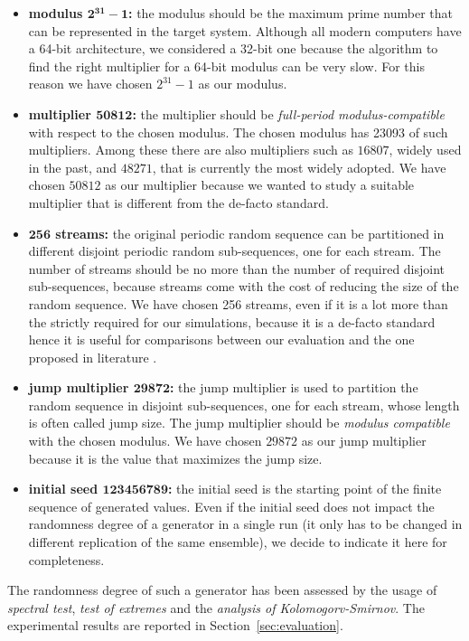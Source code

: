 \begin{itemize}
	\item \textbf{modulus $\mathbf{2^{31}-1}$:} the modulus should be the maximum prime number that can be represented in the target system. 
	Although all modern computers have a 64-bit architecture, we considered a 32-bit one because the algorithm to find the right multiplier for a 64-bit modulus can be very slow.
	For this reason we have chosen $2^{31}-1$ as our modulus.
	
	\item \textbf{multiplier $\mathbf{50812}$:} the multiplier should be \textit{full-period modulus-compatible} with respect to the chosen modulus. The chosen modulus has 23093 of such multipliers. Among these there are also multipliers such as $16807$, widely used in the past, and $48271$, that is currently the most widely adopted.
	We have chosen $50812$ as our multiplier because we wanted to study a suitable multiplier that is different from the de-facto standard.
	
	\item \textbf{$\mathbf{256}$ streams:} the original periodic random sequence can be partitioned in different disjoint periodic random sub-sequences, one for each stream. 
	The number of streams should be no more than the number of required disjoint sub-sequences, because streams come with the cost of reducing the size of the random sequence.
	We have chosen 256 streams, even if it is a lot more than the strictly required for our simulations, because it is a de-facto standard hence it is useful for comparisons between our evaluation and the one proposed in literature \cite{leemis2006discrete}. 
	
	\item \textbf{jump multiplier $\mathbf{29872}$:} the jump multiplier is used to partition the random sequence in disjoint sub-sequences, one for each stream, whose length is often called jump size. The jump multiplier should be \textit{modulus compatible} with the chosen modulus.
	We have chosen $29872$ as our jump multiplier because it is the value that maximizes the jump size.
	
	\item \textbf{initial seed $\mathbf{123456789}$:} the initial seed is the starting point of the finite sequence of generated values. Even if the initial seed does not impact the randomness degree of a generator in a single run (it only has to be changed in different replication of the same ensemble), we decide to indicate it here for completeness. 
\end{itemize}

The randomness degree of such a generator has been assessed by the usage of \textit{spectral test}, \textit{test of extremes} and the \textit{analysis of Kolomogorv-Smirnov}.
%
The experimental results are reported in Section~\ref{sec:evaluation}.
